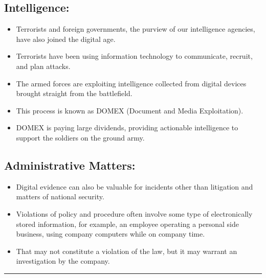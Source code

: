 \documentclass[british]{article}
\begin{document}
\subsection{Intelligence:}
\begin{itemize}
	\item Terrorists and foreign governments, the purview of our intelligence
	      agencies, have also joined the digital age.
	\item Terrorists have been using information technology to communicate,
	      recruit, and plan attacks.
	\item The armed forces are exploiting intelligence collected from digital
	      devices brought straight from the battlefield.
	\item This process is known as DOMEX (Document and Media Exploitation).
	\item DOMEX is paying large dividends, providing actionable intelligence
	      to support the soldiers on the ground army.
\end{itemize}

\subsection{Administrative Matters:}
\begin{itemize}
	\item Digital evidence can also be valuable for incidents other than litigation
	      and matters of national security.
	\item Violations of policy and procedure often involve some type of electronically
	      stored information, for example, an employee operating a personal
	      side business, using company computers while on company time.
	\item That may not constitute a violation of the law, but it may warrant
	      an investigation by the company.
\end{itemize}
\rule[0.5ex]{0.75\columnwidth}{1pt}

\vfill{}
\end{document}
